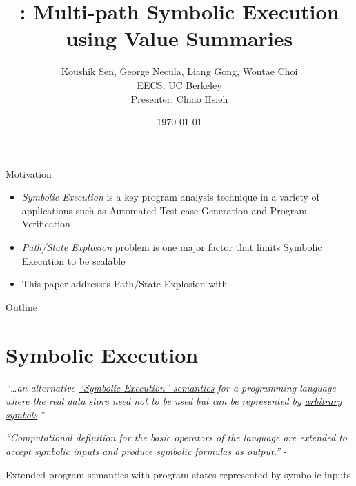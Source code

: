 \documentclass[xcolor={dvipsnames,table},16pt]{beamer}
\title[\MultiSE]{\MultiSE: Multi-path Symbolic Execution using Value Summaries}
\author[C. Hsieh]{
   Koushik Sen, George Necula, Liang Gong, Wontae Choi\texorpdfstring{\\}{}
   EECS, UC Berkeley\texorpdfstring{\\}{}
   \texorpdfstring{\bigskip}{\space}
   Presenter: Chiao Hsieh
}
\institute[@ UIUC CS]{}
\date{\today}
\begin{document}
{\nologo
\begin{frame}
\titlepage
\end{frame}
}

\begin{frame}{Motivation}
    \begin{itemize}
        \item \emph{Symbolic Execution} is a key program analysis technique in a variety of applications
        such as Automated Test-case Generation and Program Verification
        \item \emph{Path/State Explosion} problem is one major factor that limits Symbolic Execution to be scalable
        
        \item This paper addresses Path/State Explosion with \emph{\ValSums}
    \end{itemize}
\end{frame}

\begin{frame}{Outline}
  \tableofcontents
\end{frame}

\section{Symbolic Execution}\label{sec:sym-exe}

\begin{frame}{\SymExe}

\textit{
``\dots an alternative \underline{``Symbolic Execution'' semantics} for a
programming language where the real data store need not to be used but can be
represented by \underline{arbitrary symbols}.''
}

\medskip

\textit{
``Computational definition for the basic operators of the language are extended
to accept \underline{symbolic inputs} and produce \underline{symbolic formulas as output}.''
} - \cite{King76}

\begin{center}
	\myopinion
    Extended program semantics with program states represented by symbolic inputs
\end{center}

\end{frame}
\end{document}

